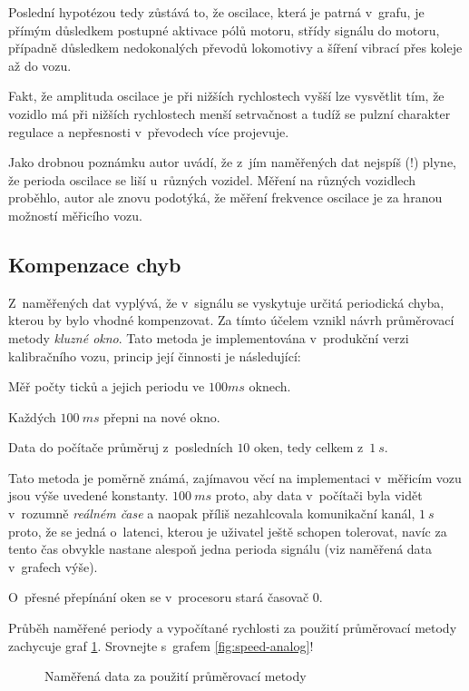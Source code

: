\begin{enumerate}
Poslední hypotézou tedy zůstává to, že oscilace, která je patrná v~grafu,
je přímým důsledkem postupné aktivace pólů motoru, střídy signálu do motoru,
případně důsledkem nedokonalých převodů lokomotivy a šíření vibrací přes
koleje až do vozu.

Fakt, že amplituda oscilace je při nižších rychlostech vyšší lze vysvětlit tím,
že vozidlo má při nižších rychlostech menší setrvačnost a tudíž se pulzní
charakter regulace a nepřesnosti v~převodech více projevuje.

Jako drobnou poznámku autor uvádí, že z~jím naměřených dat nejspíš (!) plyne,
že perioda oscilace se liší u~různých vozidel. Měření na různých vozidlech
proběhlo, autor ale znovu podotýká, že měření frekvence oscilace je za hranou
možností měřicího vozu.

\end{enumerate}

\subsection{Kompenzace chyb}
\label{subsec:wsm-kompenzace}

Z~naměřených dat vyplývá, že v~signálu se vyskytuje určitá periodická chyba,
kterou by bylo vhodné kompenzovat. Za tímto účelem vznikl návrh průměrovací
metody \textit{kluzné okno}. Tato metoda je implementována v~produkční verzi
kalibračního vozu, princip její činnosti je následující:

\begin{compactenum}
\item Měř počty ticků a jejich periodu ve $100ms$ oknech.
\item Každých $100\ ms$ přepni na nové okno.
\item Data do počítače průměruj z~posledních $10$ oken, tedy celkem z~$1\ s$.
\end{compactenum}

Tato metoda je poměrně známá, zajímavou věcí na implementaci v~měřicím vozu
jsou výše uvedené konstanty. $100\ ms$ proto, aby data v~počítači byla vidět
v~rozumně \textit{reálném čase} a naopak příliš nezahlcovala komunikační kanál,
$1\ s$ proto, že se jedná o~latenci, kterou je uživatel ještě schopen tolerovat,
navíc za tento čas obvykle nastane alespoň jedna perioda signálu (viz naměřená
data v~grafech výše).

O~přesné přepínání oken se v~procesoru stará časovač 0.

Průběh naměřené periody a vypočítané rychlosti za použití průměrovací metody
zachycuje graf \ref{fig:prumer}. Srovnejte s~grafem \ref{fig:speed-analog}!

\begin{figure}[h]

\caption{Naměřená data za použití průměrovací metody}
\label{fig:prumer}
\end{figure}
